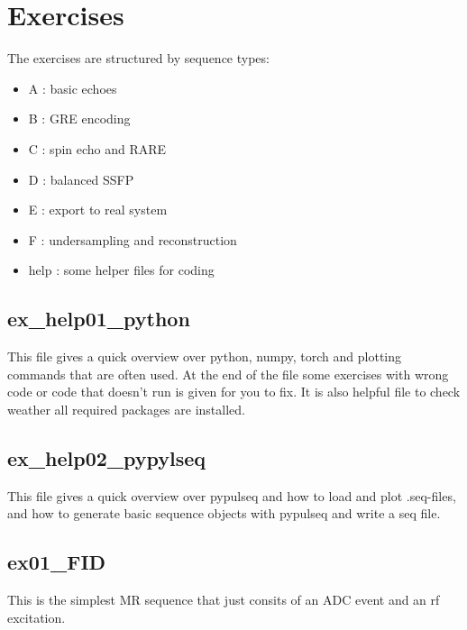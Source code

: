 \documentclass[a4paper,12pt]{extarticle}
\begin{document}
\section{Exercises}
\vspace{7.5cm}
The exercises are structured by sequence types:
\begin{itemize}
\item A : basic echoes 
\item B : GRE encoding
\item C : spin echo and RARE
\item D : balanced SSFP
\item E : export to real system
\item F : undersampling and reconstruction
\item help : some helper files for coding
\end{itemize}

\subsection{ex\_help01\_python}
This file gives a quick overview over python, numpy, torch and plotting commands that are often used.
At the end of the file some exercises with wrong code or code that doesn't run is given for you to fix.
It is also helpful file to check weather all required packages are installed. 
\subsection{ex\_help02\_pypylseq}
This file gives a quick overview over pypulseq and how to load and plot .seq-files, and how to generate basic sequence objects with pypulseq and write a seq file.

\newpage
\subsection{ex01\_FID}
This is  the simplest MR sequence that just consits of an ADC event and an rf excitation.
\end{document}
